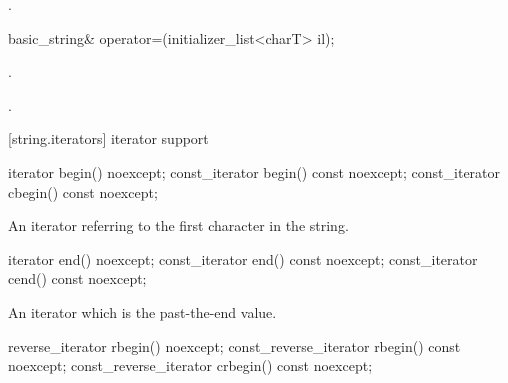 \begin{itemdescr}
\pnum
\returns
{}.
\end{itemdescr}

%
%
\begin{itemdecl}
basic_string& operator=(initializer_list<charT> il);
\end{itemdecl}

\begin{itemdescr}
\pnum
\effects {}.

\pnum
\returns {}.
\end{itemdescr}

[string.iterators]{ iterator support}

%
%
%
%
\begin{itemdecl}
iterator       begin() noexcept;
const_iterator begin() const noexcept;
const_iterator cbegin() const noexcept;
\end{itemdecl}

\begin{itemdescr}
\pnum
\returns
An iterator referring to the first character in the string.
\end{itemdescr}

%
%
%
%
\begin{itemdecl}
iterator       end() noexcept;
const_iterator end() const noexcept;
const_iterator cend() const noexcept;
\end{itemdecl}

\begin{itemdescr}
\pnum
\returns
An iterator which is the past-the-end value.
\end{itemdescr}

%
%
%
%
\begin{itemdecl}
reverse_iterator       rbegin() noexcept;
const_reverse_iterator rbegin() const noexcept;
const_reverse_iterator crbegin() const noexcept;
\end{itemdecl}

